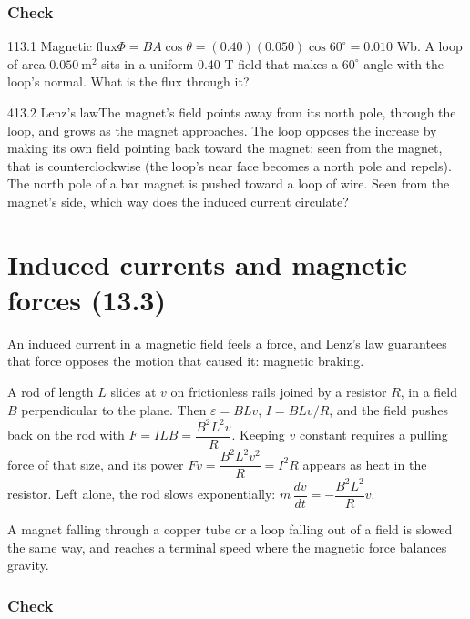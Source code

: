 \documentclass[11pt]{article}
\begin{document}
\subsubsection{Check}\mbox{}

\begin{q}{1}{13.1 Magnetic flux}{$\Phi = BA\cos\theta = (0.40)(0.050)\cos 60^\circ = 0.010$ Wb.}
A loop of area $0.050\ \mathrm{m^2}$ sits in a uniform 0.40 T field that makes a $60^\circ$ angle with the loop's normal. What is the flux through it?
\end{q}
\begin{q}{4}{13.2 Lenz's law}{The magnet's field points away from its north pole, through the loop, and grows as the magnet approaches. The loop opposes the increase by making its own field pointing back toward the magnet: seen from the magnet, that is counterclockwise (the loop's near face becomes a north pole and repels).}
The north pole of a bar magnet is pushed toward a loop of wire. Seen from the magnet's side, which way does the induced current circulate?
\end{q}

\section{Induced currents and magnetic forces (13.3)}\label{sec:2}

An induced current in a magnetic field feels a force, and Lenz's law guarantees that force opposes the motion that caused it: magnetic braking.

\begin{example}
A rod of length $L$ slides at $v$ on frictionless rails joined by a resistor $R$, in a field $B$ perpendicular to the plane. Then $\varepsilon = BLv$, $I = BLv/R$, and the field pushes back on the rod with $F = ILB = \dfrac{B^2L^2v}{R}$. Keeping $v$ constant requires a pulling force of that size, and its power $Fv = \dfrac{B^2L^2v^2}{R} = I^2R$ appears as heat in the resistor. Left alone, the rod slows exponentially: $m\,\dfrac{dv}{dt} = -\dfrac{B^2L^2}{R}v$.
\end{example}
A magnet falling through a copper tube or a loop falling out of a field is slowed the same way, and reaches a terminal speed where the magnetic force balances gravity.

\subsubsection{Check}\mbox{}
\end{document}
